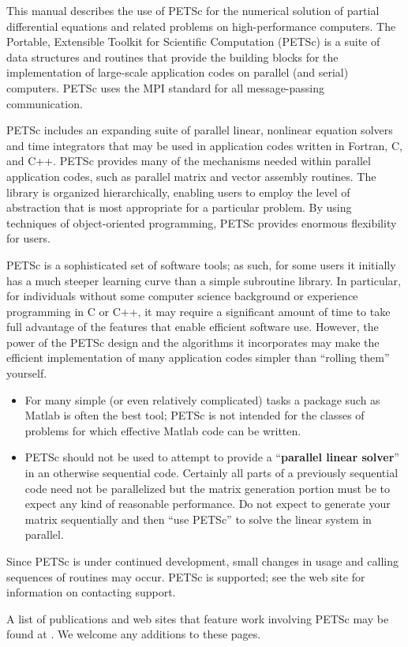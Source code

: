 
%
%

\medskip \medskip
This manual describes the use of PETSc for the numerical solution
of partial differential equations and related problems 
on high-performance computers.  The
Portable, Extensible Toolkit for Scientific Computation (PETSc) is a
suite of data structures and routines that provide the building
blocks for the implementation of large-scale application codes on parallel
(and serial) computers.  PETSc uses the MPI standard for all
message-passing communication.

PETSc includes an expanding suite of parallel linear, nonlinear
equation solvers and time integrators that may be
used in application codes written in Fortran, C, and C++.  PETSc
provides many of the mechanisms needed within parallel application
codes, such as parallel matrix and vector assembly routines. The library is
organized hierarchically, enabling users to employ the level of
abstraction that is most appropriate for a particular problem. By
using techniques of object-oriented programming, PETSc provides
enormous flexibility for users.

PETSc is a sophisticated set of software tools; as such, for some
users it initially has a much steeper learning curve than a simple
subroutine library. In particular, for individuals without some
computer science background or experience programming in C or C++, it
may require a significant amount of time to take full advantage of the
features that enable efficient software use.  However, the power of
the PETSc design and the algorithms it incorporates may make the efficient
implementation of many application codes simpler than ``rolling
them'' yourself.
\begin{itemize}
\item  For many simple (or even relatively complicated)
tasks a package such as Matlab is often the best tool; PETSc is not
intended for the classes of problems for which effective Matlab code
can be written.
\item PETSc should not be used to attempt to provide
a ``{\bf parallel linear solver}'' in an otherwise sequential code.
Certainly all parts of a previously sequential code need not be parallelized but the 
matrix generation portion must be to expect any kind of reasonable performance.
Do not expect to generate your matrix sequentially and then ``use PETSc'' to solve
the linear system in parallel.
\end{itemize}

Since PETSc is under continued development, small changes in usage and
calling sequences of routines may occur.  PETSc is supported; see the
web site  for information on
contacting support.

A list of publications and web sites that feature work involving PETSc may be found
at . 
We welcome any additions to these pages.

\medskip \medskip



